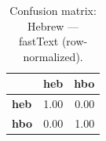 \begin{table}[htbp]
\centering
\small
\begin{tabular}{lrr}
\toprule
 & \textbf{heb} & \textbf{hbo} \\
\midrule
\textbf{heb} & \cellcolor{blue!99}\color{white}1.00 & \cellcolor{blue!0}0.00 \\
\textbf{hbo} & \cellcolor{blue!0}0.00 & \cellcolor{blue!99}\color{white}1.00 \\
\bottomrule
\end{tabular}
\caption{Confusion matrix: Hebrew — fastText (row-normalized).}
\label{tab:cm-hebrew-fasttext}
\end{table}